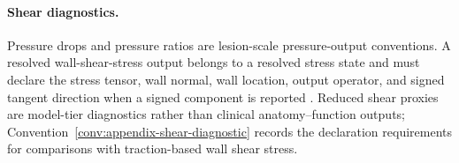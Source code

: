 \paragraph{Shear diagnostics.}
Pressure drops and pressure ratios are lesion-scale pressure-output
conventions. A resolved wall-shear-stress output belongs to a resolved stress
state and must declare the stress tensor, wall normal, wall location, output
operator, and signed tangent direction when a signed component is reported
\cite[Abstract; Sec.~2, pp.~8--10]{JohnEtAl2017WallShearStressVectorForm}.
Reduced shear proxies are model-tier diagnostics rather than clinical
anatomy--function outputs; Convention~\ref{conv:appendix-shear-diagnostic}
records the declaration requirements for comparisons with traction-based wall
shear stress.
